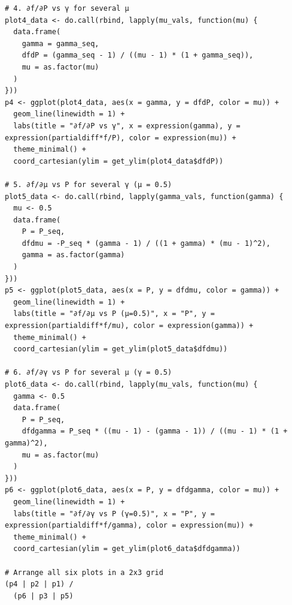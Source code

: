 \documentclass{article}
\begin{document}
\begin{lstlisting}[style=R]
# 4. ∂f/∂P vs γ for several μ  
plot4_data <- do.call(rbind, lapply(mu_vals, function(mu) {  
  data.frame(  
    gamma = gamma_seq,  
    dfdP = (gamma_seq - 1) / ((mu - 1) * (1 + gamma_seq)),  
    mu = as.factor(mu)  
  )  
}))  
p4 <- ggplot(plot4_data, aes(x = gamma, y = dfdP, color = mu)) +  
  geom_line(linewidth = 1) +  
  labs(title = "∂f/∂P vs γ", x = expression(gamma), y = expression(partialdiff*f/P), color = expression(mu)) +  
  theme_minimal() +  
  coord_cartesian(ylim = get_ylim(plot4_data$dfdP))  

# 5. ∂f/∂μ vs P for several γ (μ = 0.5)  
plot5_data <- do.call(rbind, lapply(gamma_vals, function(gamma) {  
  mu <- 0.5  
  data.frame(  
    P = P_seq,  
    dfdmu = -P_seq * (gamma - 1) / ((1 + gamma) * (mu - 1)^2),  
    gamma = as.factor(gamma)  
  )  
}))  
p5 <- ggplot(plot5_data, aes(x = P, y = dfdmu, color = gamma)) +  
  geom_line(linewidth = 1) +  
  labs(title = "∂f/∂μ vs P (μ=0.5)", x = "P", y = expression(partialdiff*f/mu), color = expression(gamma)) +  
  theme_minimal() +  
  coord_cartesian(ylim = get_ylim(plot5_data$dfdmu))  

# 6. ∂f/∂γ vs P for several μ (γ = 0.5)  
plot6_data <- do.call(rbind, lapply(mu_vals, function(mu) {  
  gamma <- 0.5  
  data.frame(  
    P = P_seq,  
    dfdgamma = P_seq * ((mu - 1) - (gamma - 1)) / ((mu - 1) * (1 + gamma)^2),  
    mu = as.factor(mu)  
  )  
}))  
p6 <- ggplot(plot6_data, aes(x = P, y = dfdgamma, color = mu)) +  
  geom_line(linewidth = 1) +  
  labs(title = "∂f/∂γ vs P (γ=0.5)", x = "P", y = expression(partialdiff*f/gamma), color = expression(mu)) +  
  theme_minimal() +  
  coord_cartesian(ylim = get_ylim(plot6_data$dfdgamma))  

# Arrange all six plots in a 2x3 grid
(p4 | p2 | p1) /  
  (p6 | p3 | p5)  
\end{lstlisting}  
\end{document}
